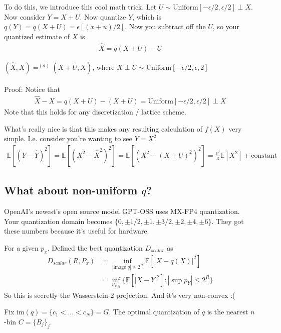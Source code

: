 To do this, we introduce this cool math trick. Let $U \sim \text{Uniform}[-\epsilon/2, \epsilon/2] \perp X$. Now consider $Y = X+ U$. Now quantize $Y$, which is $q(Y) = q(X+U) = \epsilon[(x+u)/2]$. Now you subtract off the $U$, so your quantized estimate of $X$ is
\begin{align}
	\hat X = q(X+U) - U
\end{align}

\begin{proposition}
	 $(\hat X, X) =^{(d)} (X+ \tilde U, X)$, where $X \perp \tilde U \sim \text{Uniform}[-\epsilon/2,\epsilon,2]$
	\\
	\\
	Proof: Notice that
	\begin{align}
		\hat X - X = q(X +U ) - (X+U) = \text{Uniform}[-\epsilon/2, \epsilon/2] \perp X
	\end{align}
	Note that this holds for any discretization / lattice scheme.
\end{proposition}
What's really nice is that this makes any resulting calculation of $f(X)$ very simple. I.e. consider you're wanting to see $Y = X^2$
\begin{align}
	\mathbb E[(Y - \hat Y)^2] = \mathbb E[(X^2 - \hat X^2)^2] = \mathbb E[(X^2 - (X+U)^2)^2] = \frac{\epsilon^2}{3}\mathbb E[X^2] + \text{constant}
\end{align}

\subsection{What about non-uniform $q$?}
OpenAI's newest's open source model GPT-OSS uses MX-FP4 quantization. Your quantization domain becomes $\{0, \pm 1/2, \pm 1, \pm 3/2, \pm 2, \pm 4, \pm 6 \}$. They got these numbers because it's useful for hardware.


\begin{definition}
	For a given $p_x$. Defined the best quantization $D_{scalar}$ as
	\begin{align}
		D_{scalar} (R, P_x) & = \inf_{|\text{image } q| \leq 2^R} \mathbb E[|X-q(X)|^2]\\
		& = \inf_{p_{x,y}} \{ \mathbb E[|X-Y|^2] : |\sup p_Y| \leq 2^R\}
	\end{align}
	So this is secretly the Wasserstein-2 projection. And it's very non-convex :(
\end{definition}


Fix $\text{im}(q) = \{c_1 <  ... < c_N\} = G$. The optimal quantization of $q$ is the nearest $n$-bin $C = \{B_j\}_j$. 

